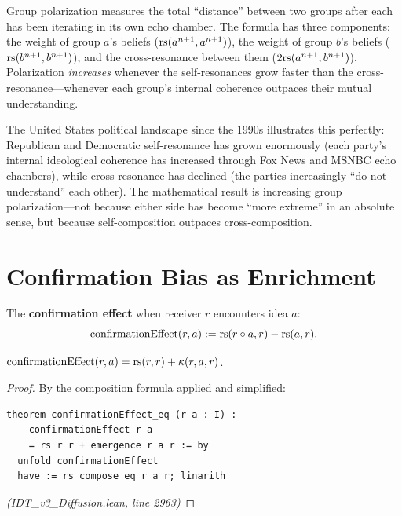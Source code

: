 \begin{interpretation}
Group polarization measures the total ``distance'' between two groups after
each has been iterating in its own echo chamber. The formula has three
components: the weight of group $a$'s beliefs ($\mathrm{rs}(a^{n+1}, a^{n+1})$),
the weight of group $b$'s beliefs ($\mathrm{rs}(b^{n+1}, b^{n+1})$), and the
cross-resonance between them ($2\mathrm{rs}(a^{n+1}, b^{n+1})$). Polarization
\emph{increases} whenever the self-resonances grow faster than the
cross-resonance---whenever each group's internal coherence outpaces their
mutual understanding.

The United States political landscape since the 1990s illustrates this
perfectly: Republican and Democratic self-resonance has grown enormously
(each party's internal ideological coherence has increased through Fox News
and MSNBC echo chambers), while cross-resonance has declined (the parties
increasingly ``do not understand'' each other). The mathematical result is
increasing group polarization---not because either side has become ``more
extreme'' in an absolute sense, but because self-composition outpaces
cross-composition.
\end{interpretation}

\section{Confirmation Bias as Enrichment}

\begin{definition}
\label{def:confirmation}
The \textbf{confirmation effect} when receiver $r$ encounters idea $a$:
\[
  \mathrm{confirmationEffect}(r, a) := \mathrm{rs}(r \circ a, r) - \mathrm{rs}(a, r).
\]
\end{definition}

\begin{theorem}
\label{thm:confirmation-eq}
$\mathrm{confirmationEffect}(r, a) = \mathrm{rs}(r, r) + \kappa(r, a, r)$.
\end{theorem}

\begin{proof}
By the composition formula applied and simplified:
\begin{lstlisting}
theorem confirmationEffect_eq (r a : I) :
    confirmationEffect r a
    = rs r r + emergence r a r := by
  unfold confirmationEffect
  have := rs_compose_eq r a r; linarith
\end{lstlisting}
\textit{(IDT\_v3\_Diffusion.lean, line 2963)}
\end{proof}

